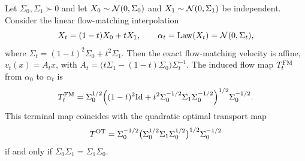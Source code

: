 \begin{prop}\label{prop-gaussian-flow-matching-optimality}
	Let $\Sigma_0,\Sigma_1\succ0$ and let $X_0\sim\mathcal{N}(0,\Sigma_0)$ and $X_1\sim\mathcal{N}(0,\Sigma_1)$ be independent. Consider the linear flow-matching interpolation
	\[
		X_t=(1-t)X_0+tX_1,
		\qquad
		\alpha_t=\operatorname{Law}(X_t)=\mathcal{N}(0,\Sigma_t),
	\]
	where $\Sigma_t=(1-t)^2\Sigma_0+t^2\Sigma_1$. Then the exact flow-matching velocity is affine, $v_t(x)=A_tx$, with $A_t=\bigl(t\Sigma_1-(1-t)\Sigma_0\bigr)\Sigma_t^{-1}$.
	The induced flow map $T_t^{\rm FM}$ from $\alpha_0$ to $\alpha_t$ is
	\begin{equation}\label{eq-gaussian-product-fm-map}
		T_t^{\rm FM}
		=
		\Sigma_0^{1/2}
		\Bigl((1-t)^2\mathrm{Id}+t^2\Sigma_0^{-1/2}\Sigma_1\Sigma_0^{-1/2}\Bigr)^{1/2}
		\Sigma_0^{-1/2}.
	\end{equation}
	This terminal map coincides with the quadratic optimal transport map
	\begin{equation}\label{eq-gaussian-brenier-map-comparison}
		T^{\rm OT}
		=
		\Sigma_0^{-1/2}
		\bigl(\Sigma_0^{1/2}\Sigma_1\Sigma_0^{1/2}\bigr)^{1/2}
		\Sigma_0^{-1/2}
	\end{equation}
	if and only if $\Sigma_0\Sigma_1=\Sigma_1\Sigma_0$.
\end{prop}

